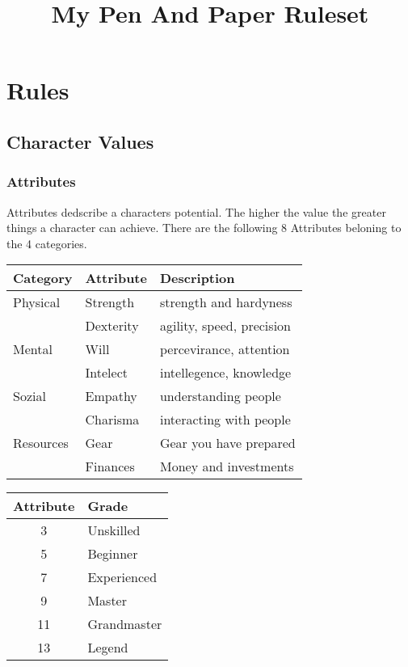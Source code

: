 \documentclass[11pt]{article}
\date{}
\title{My Pen And Paper Ruleset}
\begin{document}
\maketitle
{


\section{Rules}
\label{sec:org33ad939}

\begin{multicols}{2}[]
\subsection{Character Values}
\label{sec:orgedccad4}
\subsubsection{Attributes}
\label{sec:orge7e2447}
Attributes dedscribe a characters potential. The higher the value the greater things a character can achieve. There are the following 8 Attributes beloning to the 4 categories.

\begin{center}
\begin{tabular}{lll}
\textbf{Category} & \textbf{Attribute} & \textbf{Description}\\
\hline
Physical & Strength & strength and hardyness\\
 & Dexterity & agility, speed, precision\\
\hline
Mental & Will & percevirance, attention\\
 & Intelect & intellegence, knowledge\\
\hline
Sozial & Empathy & understanding people\\
 & Charisma & interacting with people\\
\hline
Resources & Gear & Gear you have prepared\\
 & Finances & Money and investments\\
\end{tabular}
\end{center}

\begin{center}
\begin{tabular}{c|l}
\textbf{Attribute} & \textbf{Grade}\\
\hline
3 & Unskilled\\
5 & Beginner\\
7 & Experienced\\
9 & Master\\
11 & Grandmaster\\
13 & Legend\\
\end{tabular}
\end{center}


\end{multicols}}
\end{document}
